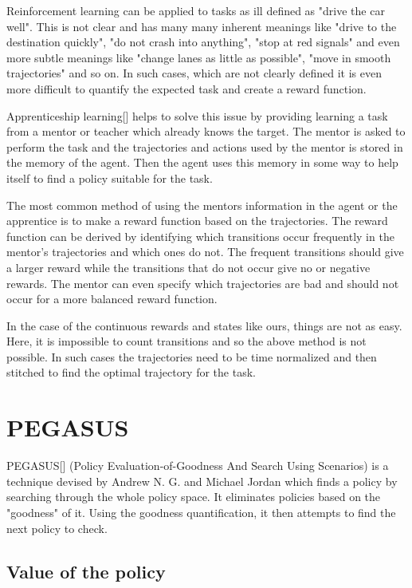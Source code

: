 \documentclass[BTech]{iitmdiss}
\begin{document}
Reinforcement learning can be applied to tasks as ill defined as "drive the car well". This is not clear and has many many inherent meanings like "drive to the destination quickly", "do not crash into anything", "stop at red signals" and even more subtle meanings like "change lanes as little as possible", "move in smooth trajectories" and so on. In such cases, which are not clearly defined it is even more difficult to quantify the expected task and create a reward function.

Apprenticeship learning[] helps to solve this issue by providing  learning a task from a mentor or teacher which already knows the target. The mentor is asked to perform the task and the trajectories and actions used by the mentor is stored in the memory of the agent. Then the agent uses this memory in some way to help itself to find a policy suitable for the task.

The most common method of using the mentors information in the agent or the apprentice is to make a reward function based on the trajectories. The reward function can be derived by identifying which transitions occur frequently in the mentor's trajectories and which ones do not. The frequent transitions should give a larger reward while the transitions that do not occur give no or negative rewards. The mentor can even specify which trajectories are bad and should not occur for a more balanced reward function.

In the case of the continuous rewards and states like ours, things are not as easy. Here, it is impossible to count transitions and so the above method is not possible. In such cases the trajectories need to be time normalized and then stitched to find the optimal trajectory for the task.


\chapter{PEGASUS}

PEGASUS[] (Policy Evaluation-of-Goodness And Search Using Scenarios) is a technique devised by Andrew N. G. and Michael Jordan which finds a policy by searching through the whole policy space. It eliminates policies based on the "goodness" of it. Using the goodness quantification, it then attempts to find the next policy to check.

\section{Value of the policy}
\end{document}
